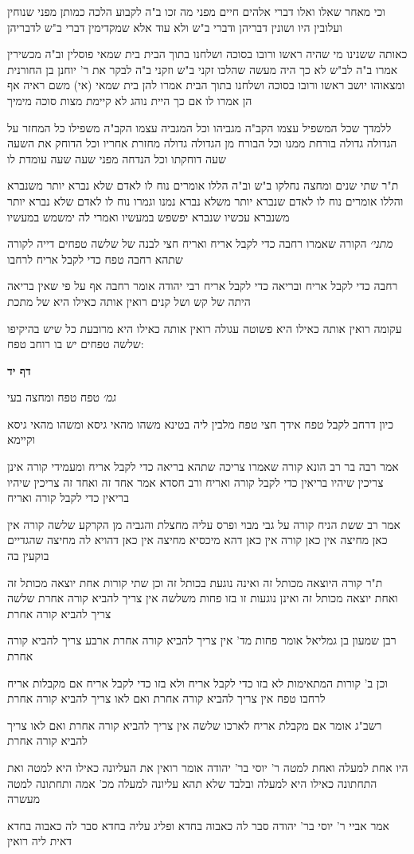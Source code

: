 \documentclass[12pt, openany]{book}
\newcommand{\sethebfont}{
\fontsize{10.5pt}{21.0pt} \selectfont
}
\newcommand{\textblock}[1]{
{\sethebfont #1\\}	
}
\newcommand{\sectname}{}
\newcommand{\newsection}[1]{
	\addcontentsline{toc}{section}{#1}
	\renewcommand{\sectname}{#1}	
	\vspace{-\baselineskip}
	\begin{center}
		\textbf{%
\fontsize{16pt}{16pt}\selectfont
			#1}
	\end{center}
	\vspace{-\baselineskip}
	\nopagebreak
}
\begin{document}
\textblock{וכי מאחר שאלו ואלו דברי אלהים חיים מפני מה זכו ב"ה לקבוע הלכה כמותן מפני שנוחין ועלובין היו ושונין דבריהן ודברי ב"ש ולא עוד אלא שמקדימין דברי ב"ש לדבריהן}
\textblock{כאותה ששנינו מי שהיה ראשו ורובו בסוכה ושלחנו בתוך הבית בית שמאי פוסלין וב"ה מכשירין אמרו ב"ה לב"ש לא כך היה מעשה שהלכו זקני ב"ש וזקני ב"ה לבקר את ר' יוחנן בן החורנית ומצאוהו יושב ראשו ורובו בסוכה ושלחנו בתוך הבית אמרו להן בית שמאי (אי) משם ראיה אף הן אמרו לו אם כך היית נוהג לא קיימת מצות סוכה מימיך}
\textblock{ללמדך שכל המשפיל עצמו הקב"ה מגביהו וכל המגביה עצמו הקב"ה משפילו כל המחזר על הגדולה גדולה בורחת ממנו וכל הבורח מן הגדולה גדולה מחזרת אחריו וכל הדוחק את השעה שעה דוחקתו וכל הנדחה מפני שעה שעה עומדת לו}
\textblock{ת"ר שתי שנים ומחצה נחלקו ב"ש וב"ה הללו אומרים נוח לו לאדם שלא נברא יותר משנברא והללו אומרים נוח לו לאדם שנברא יותר משלא נברא נמנו וגמרו נוח לו לאדם שלא נברא יותר משנברא עכשיו שנברא יפשפש במעשיו ואמרי לה ימשמש במעשיו}
\textblock{{\large\emph{מתני׳}} הקורה שאמרו רחבה כדי לקבל אריח ואריח חצי לבנה של שלשה טפחים דייה לקורה שתהא רחבה טפח כדי לקבל אריח לרחבו}
\textblock{רחבה כדי לקבל אריח ובריאה כדי לקבל אריח רבי יהודה אומר רחבה אף על פי שאין בריאה היתה של קש ושל קנים רואין אותה כאילו היא של מתכת}
\textblock{עקומה רואין אותה כאילו היא פשוטה עגולה רואין אותה כאילו היא מרובעת כל שיש בהיקיפו שלשה טפחים יש בו רוחב טפח:}
\newsection{דף יד}
\textblock{{\large\emph{גמ׳}} טפח טפח ומחצה בעי}
\textblock{כיון דרחב לקבל טפח אידך חצי טפח מלבין ליה בטינא משהו מהאי גיסא ומשהו מהאי גיסא וקיימא}
\textblock{אמר רבה בר רב הונא קורה שאמרו צריכה שתהא בריאה כדי לקבל אריח ומעמידי קורה אינן צריכין שיהיו בריאין כדי לקבל קורה ואריח ורב חסדא אמר אחד זה ואחד זה צריכין שיהיו בריאין כדי לקבל קורה ואריח}
\textblock{אמר רב ששת הניח קורה על גבי מבוי ופרס עליה מחצלת והגביה מן הקרקע שלשה קורה אין כאן מחיצה אין כאן קורה אין כאן דהא מיכסיא מחיצה אין כאן דהויא לה מחיצה שהגדיים בוקעין בה}
\textblock{ת"ר קורה היוצאה מכותל זה ואינה נוגעת בכותל זה וכן שתי קורות אחת יוצאה מכותל זה ואחת יוצאה מכותל זה ואינן נוגעות זו בזו פחות משלשה אין צריך להביא קורה אחרת שלשה צריך להביא קורה אחרת}
\textblock{רבן שמעון בן גמליאל אומר פחות מד' אין צריך להביא קורה אחרת ארבע צריך להביא קורה אחרת}
\textblock{וכן ב' קורות המתאימות לא בזו כדי לקבל אריח ולא בזו כדי לקבל אריח אם מקבלות אריח לרחבו טפח אין צריך להביא קורה אחרת ואם לאו צריך להביא קורה אחרת}
\textblock{רשב"ג אומר אם מקבלת אריח לארכו שלשה אין צריך להביא קורה אחרת ואם לאו צריך להביא קורה אחרת}
\textblock{היו אחת למעלה ואחת למטה ר' יוסי בר' יהודה אומר רואין את העליונה כאילו היא למטה ואת התחתונה כאילו היא למעלה ובלבד שלא תהא עליונה למעלה מכ' אמה ותחתונה למטה מעשרה}
\textblock{אמר אביי ר' יוסי בר' יהודה סבר לה כאבוה בחדא ופליג עליה בחדא סבר לה כאבוה בחדא דאית ליה רואין}
\end{document}

